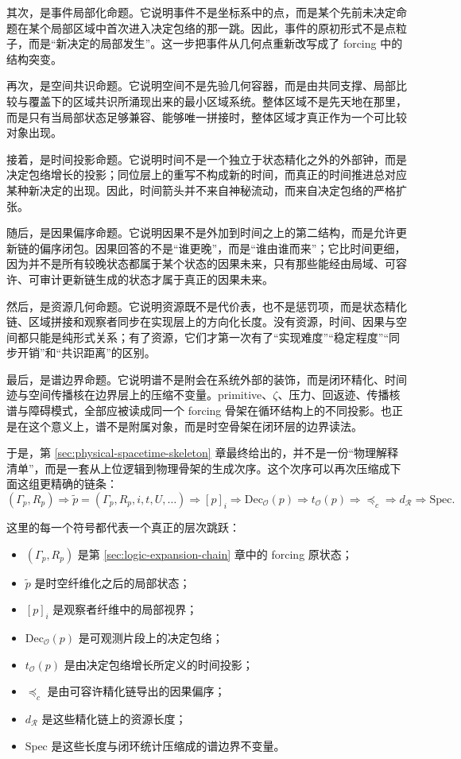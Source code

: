 其次，是事件局部化命题。它说明事件不是坐标系中的点，而是某个先前未决定命题在某个局部区域中首次进入决定包络的那一跳。因此，事件的原初形式不是点粒子，而是“新决定的局部发生”。这一步把事件从几何点重新改写成了 forcing 中的结构突变。

再次，是空间共识命题。它说明空间不是先验几何容器，而是由共同支撑、局部比较与覆盖下的区域共识所涌现出来的最小区域系统。整体区域不是先天地在那里，而是只有当局部状态足够兼容、能够唯一拼接时，整体区域才真正作为一个可比较对象出现。

接着，是时间投影命题。它说明时间不是一个独立于状态精化之外的外部钟，而是决定包络增长的投影；同位层上的重写不构成新的时间，而真正的时间推进总对应某种新决定的出现。因此，时间箭头并不来自神秘流动，而来自决定包络的严格扩张。

随后，是因果偏序命题。它说明因果不是外加到时间之上的第二结构，而是允许更新链的偏序闭包。因果回答的不是“谁更晚”，而是“谁由谁而来”；它比时间更细，因为并不是所有较晚状态都属于某个状态的因果未来，只有那些能经由局域、可容许、可审计更新链生成的状态才属于真正的因果未来。

然后，是资源几何命题。它说明资源既不是代价表，也不是惩罚项，而是状态精化链、区域拼接和观察者同步在实现层上的方向化长度。没有资源，时间、因果与空间都只能是纯形式关系；有了资源，它们才第一次有了“实现难度”“稳定程度”“同步开销”和“共识距离”的区别。

最后，是谱边界命题。它说明谱不是附会在系统外部的装饰，而是闭环精化、时间迹与空间传播核在边界层上的压缩不变量。primitive、\(\zeta\)、压力、回返迹、传播核谱与障碍模式，全部应被读成同一个 forcing 骨架在循环结构上的不同投影。也正是在这个意义上，谱不是附属对象，而是时空骨架在闭环层的边界读法。

于是，第 \ref{sec:physical-spacetime-skeleton} 章最终给出的，并不是一份“物理解释清单”，而是一套从上位逻辑到物理骨架的生成次序。这个次序可以再次压缩成下面这组更精确的链条：
\[
(\Gamma_p,R_p)
\Longrightarrow
\widetilde p=(\Gamma_p,R_p,i,t,U,\ldots)
\Longrightarrow
[p]_i
\Longrightarrow
\mathrm{Dec}_{\mathcal O}(p)
\Longrightarrow
t_{\mathcal O}(p)
\Longrightarrow
\preceq_c
\Longrightarrow
d_{\mathcal R}
\Longrightarrow
\mathrm{Spec}.
\]

这里的每一个符号都代表一个真正的层次跳跃：
\begin{itemize}
  \item \((\Gamma_p,R_p)\) 是第 \ref{sec:logic-expansion-chain} 章中的 forcing 原状态；
  \item \(\widetilde p\) 是时空纤维化之后的局部状态；
  \item \([p]_i\) 是观察者纤维中的局部视界；
  \item \(\mathrm{Dec}_{\mathcal O}(p)\) 是可观测片段上的决定包络；
  \item \(t_{\mathcal O}(p)\) 是由决定包络增长所定义的时间投影；
  \item \(\preceq_c\) 是由可容许精化链导出的因果偏序；
  \item \(d_{\mathcal R}\) 是这些精化链上的资源长度；
  \item \(\mathrm{Spec}\) 是这些长度与闭环统计压缩成的谱边界不变量。
\end{itemize}

